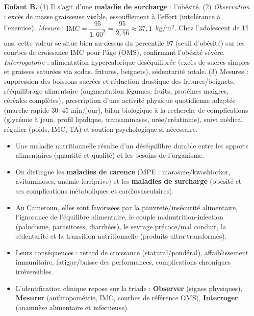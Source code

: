 \documentclass[11pt]{article}
\newcommand{\cle}[1]{{\popxbold\color{popdark}#1}}
\begin{document}
\begin{exoresolu}
\textbf{Enfant B.} (1) Il s'agit d'une \textbf{maladie de surcharge} : l'obésité. (2) \emph{Observation} : excès de masse graisseuse visible, essoufflement à l'effort (intolérance à l'exercice). \emph{Mesure} : $\mathrm{IMC} = \dfrac{95}{1{,}60^2} = \dfrac{95}{2{,}56} \approx 37,1$~kg/m$^2$. Chez l'adolescent de 15 ans, cette valeur se situe bien au-dessus du percentile 97 (seuil d'obésité) sur les courbes de croissance IMC pour l'âge (OMS), confirmant l'obésité sévère. \emph{Interrogatoire} : alimentation hypercalorique déséquilibrée (excès de sucres simples et graisses saturées via sodas, fritures, beignets), sédentarité totale. (3) Mesures : suppression des boissons sucrées et réduction drastique des fritures/beignets, rééquilibrage alimentaire (augmentation légumes, fruits, protéines maigres, céréales complètes), prescription d'une activité physique quotidienne adaptée (marche rapide 30--45 min/jour), bilan biologique à la recherche de complications (glycémie à jeun, profil lipidique, transaminases, urée/créatinine), suivi médical régulier (poids, IMC, TA) et soutien psychologique si nécessaire.
\end{exoresolu}

\begin{aretenir}
\begin{itemize}
  \item Une \cle{maladie nutritionnelle} résulte d'un déséquilibre durable entre les apports alimentaires (quantité et qualité) et les besoins de l'organisme.
  \item On distingue les \textbf{maladies de carence} (MPE : marasme/kwashiorkor, avitaminoses, anémie ferriprive) et les \textbf{maladies de surcharge} (obésité et ses complications métaboliques et cardiovasculaires).
  \item Au Cameroun, elles sont favorisées par la pauvreté/insécurité alimentaire, l'ignorance de l'équilibre alimentaire, le couple malnutrition-infection (paludisme, parasitoses, diarrhées), le sevrage précoce/mal conduit, la sédentarité et la transition nutritionnelle (produits ultra-transformés).
  \item Leurs conséquences : retard de croissance (statural/pondéral), affaiblissement immunitaire, fatigue/baisse des performances, complications chroniques irréversibles.
  \item L'identification clinique repose sur la triade : \textbf{Observer} (signes physiques), \textbf{Mesurer} (anthropométrie, IMC, courbes de référence OMS), \textbf{Interroger} (anamnèse alimentaire et infectieuse).
\end{itemize}
\end{aretenir}
\end{document}
